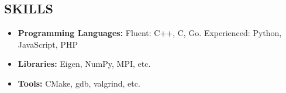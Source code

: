 \documentclass{res}
\begin{document}
\begin{resume}
	
		
	
	
	
	
	
	
	
	
	
	
	\section{\MakeUppercase{Skills}} \vskip 0.35in
	\begin{itemize}[leftmargin=\parindent]
	\setlength{\itemsep}{6pt}
	
		\item[] {\bf Programming Languages:} Fluent: C++, C, Go. Experienced: Python, JavaScript, PHP
		\item[] {\bf Libraries:} Eigen, NumPy, MPI, etc.
		\item[] {\bf Tools:} CMake, gdb, valgrind, etc.
	\end{itemize}
	
		
	
	
	\end{resume}
	
\end{document}
